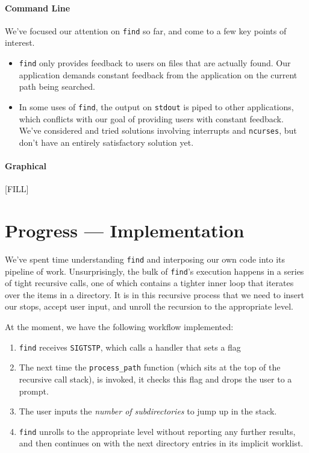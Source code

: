 \documentclass{article}
\begin{document}
\paragraph{Command Line}

We've focused our attention on {\tt find} so far, and come to a few
key points of interest.

\begin{itemize}
\item {\tt find} only provides feedback to users on files that are
  actually found.  Our application demands constant feedback from the
  application on the current path being searched.
\item In some uses of {\tt find}, the output on {\tt stdout} is piped
  to other applications, which conflicts with our goal of providing
  users with constant feedback.  We've considered and tried solutions
  involving interrupts and {\tt ncurses}, but don't have an entirely
  satisfactory solution yet.
\end{itemize}

\paragraph{Graphical}

[FILL]

\section{Progress --- Implementation}

We've spent time understanding {\tt find} and interposing our own code
into its pipeline of work.  Unsurprisingly, the bulk of {\tt find}'s
execution happens in a series of tight recursive calls, one of which
contains a tighter inner loop that iterates over the items in a
directory.  It is in this recursive process that we need to insert our
stops, accept user input, and unroll the recursion to the appropriate
level.

At the moment, we have the following workflow implemented:

\begin{enumerate}
\item {\tt find} receives {\tt SIGTSTP}, which calls a handler that
  sets a flag
\item The next time the {\tt process\_path} function (which sits at
  the top of the recursive call stack), is invoked, it checks this
  flag and drops the user to a prompt.
\item The user inputs the \emph{number of subdirectories} to jump up
  in the stack.
\item {\tt find} unrolls to the appropriate level without reporting
  any further results, and then continues on with the next directory
  entries in its implicit worklist.
\end{enumerate}
\end{document}
